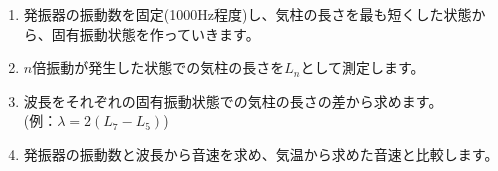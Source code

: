 
\begin{enumerate}

\item 発振器の振動数を固定(1000Hz程度)し、気柱の長さを最も短くした状態から、固有振動状態を作っていきます。

\item $n$倍振動が発生した状態での気柱の長さを$L_n$として測定します。

\item 波長をそれぞれの固有振動状態での気柱の長さの差から求めます。\\(例：$\lambda=2(L_7-L_5)$)

\item 発振器の振動数と波長から音速を求め、気温から求めた音速と比較します。

\end{enumerate}

